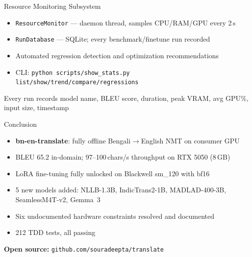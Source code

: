 \documentclass[aspectratio=169,10pt]{beamer}
\begin{document}
\begin{frame}{Resource Monitoring Subsystem}
  \begin{itemize}
    \item \texttt{ResourceMonitor} --- daemon thread, samples CPU/RAM/GPU every 2\,s
    \item \texttt{RunDatabase} --- SQLite; every benchmark/finetune run recorded
    \item Automated regression detection and optimization recommendations
    \item CLI: \texttt{python scripts/show\_stats.py list/show/trend/compare/regressions}
  \end{itemize}
  \vspace{0.3cm}
  \begin{block}{Every run records}
    model name, BLEU score, duration, peak VRAM, avg GPU\%, input size, timestamp
  \end{block}
\end{frame}

\begin{frame}{Conclusion}
  \begin{itemize}
    \item \textbf{bn-en-translate}: fully offline Bengali$\to$English NMT on consumer GPU
    \item BLEU 65.2 in-domain; 97--100\,chars/s throughput on RTX 5050 (8\,GB)
    \item LoRA fine-tuning fully unlocked on Blackwell sm\_120 with bf16
    \item 5 new models added: NLLB-1.3B, IndicTrans2-1B, MADLAD-400-3B, SeamlessM4T-v2, Gemma~3
    \item Six undocumented hardware constraints resolved and documented
    \item 212 TDD tests, all passing
  \end{itemize}
  \vspace{0.4cm}
  \begin{center}
    \textbf{Open source:} \texttt{github.com/souradeepta/translate}
  \end{center}
\end{frame}
\end{document}
